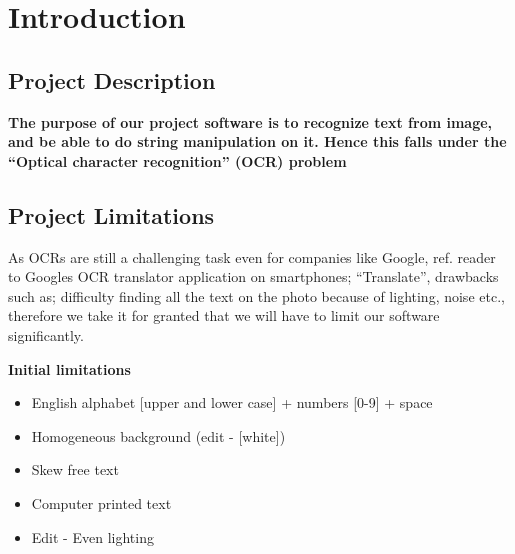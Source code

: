 \documentclass[Report.tex]{subfiles}
\begin{document}
\chapter{Introduction}
\label{sec:Introduction}
\section{Project Description}
\textbf{The purpose of our project software is to recognize text from image,
and be able to do string manipulation on it. Hence this falls under the
``Optical character recognition'' (OCR) problem}

\section{Project Limitations}
As OCRs are still a challenging task even for companies like
Google, ref. reader to Googles OCR translator application on smartphones;
``Translate'', drawbacks such as; difficulty finding all the text on the photo
because of lighting, noise etc., therefore we take it for granted that we will
have to limit our software significantly.

\begin{flushleft}
  \textbf{Initial limitations}
  \begin{itemize}
    \item{English alphabet [upper and lower case] + numbers [0-9] + space}
    \item{Homogeneous background (edit - [white])}
    \item{Skew free text}
    \item{Computer printed text}
    \item{Edit - Even lighting}
  \end{itemize}
\end{flushleft}
\end{document}
